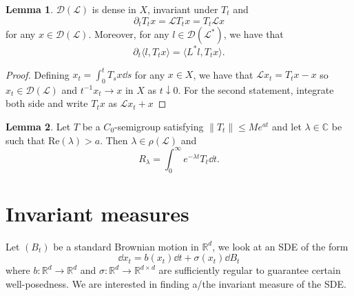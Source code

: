 \documentclass[]{article}
\theoremstyle{definition}
\theoremstyle{definition}
\newtheorem{lemma}{Lemma}
\begin{document}
\begin{lemma}
  \(\mathcal{D}(\mathcal{L})\) is dense in \(X\), invariant under \(T_t\) and 
  \[\partial_t T_t x = \mathcal{L}T_t x = T_t \mathcal{L}x\]
  for any \(x \in \mathcal{D}(\mathcal{L})\). 
  Moreover, for any \(l \in \mathcal{D}(\mathcal{L}^*)\), we have that 
  \[\partial_t \langle l, T_t x\rangle = \langle L^* l, T_t x\rangle.\]
\end{lemma}
\begin{proof}
  Defining \(x_t = \int_0^t T_s x \dd s\) for any \(x \in X\), we have that \(\mathcal{L} x_t = T_t x - x\)
  so \(x_t \in \mathcal{D}(\mathcal{L})\) and \(t^{-1} x_t \to x\) in \(X\) as \(t \downarrow 0\). 
  For the second statement, integrate both side and write \(T_t x\) as \(\mathcal{L}x_t + x\)
\end{proof}

\begin{lemma}
  Let \(T\) be a \(C_0\)-semigroup satisfying \(\|T_t\| \le Me^{at}\) and let \(\lambda \in \mathbb{C}\) 
  be such that \(\text{Re}(\lambda) > a\). Then \(\lambda \in \rho(\mathcal{L})\) and
  \[R_\lambda = \int_0^\infty e^{-\lambda t} T_t \dd t.\]
\end{lemma}

\section*{Invariant measures}

Let \((B_t)\) be a standard Brownian motion in \(\mathbb{R}^d\), we look at an SDE of the form 
\begin{equation}\label{eq:sde}
  \dd x_t = b(x_t) \dd t + \sigma(x_t) \dd B_t
\end{equation}
where \(b : \mathbb{R}^d \to \mathbb{R}^d\) and \(\sigma : \mathbb{R}^d \to \mathbb{R}^{d \times d}\) 
are sufficiently regular to guarantee certain well-posedness. We are interested in finding a/the invariant 
measure of the SDE.
\end{document}
